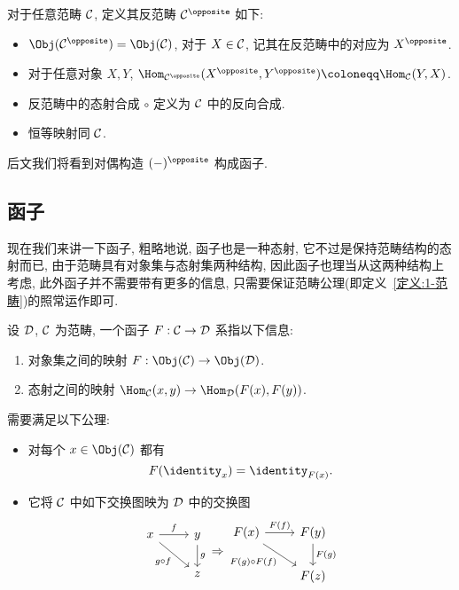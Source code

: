 \begin{definition}
    对于任意范畴 $\cal{C}$, 定义其反范畴 $\cal{C}^{\opposite}$ 如下:
    \begin{itemize}
        \item $\Obj(\cal{C}^{\opposite}) = \Obj(\cal{C})$, 对于 $X\in \cal{C}$, 记其在反范畴中的对应为 $X^{\opposite}$.
        \item 对于任意对象 $X,Y$, $\Hom_{\cal{C}^{\opposite}}(X^{\opposite},Y^{\opposite}) \coloneqq \Hom_{\cal{C}}(Y,X)$.
        \item 反范畴中的态射合成 $\circ$ 定义为 $\cal{C}$ 中的反向合成.
        \item 恒等映射同 $\cal{C}$.
    \end{itemize}
\end{definition}
后文我们将看到对偶构造 $(-)^{\opposite}$ 构成函子.
\subsection{函子}
现在我们来讲一下函子, 粗略地说, 函子也是一种态射, 它不过是保持范畴结构的态射而已, 由于范畴具有对象集与态射集两种结构, 因此函子也理当从这两种结构上考虑, 此外函子并不需要带有更多的信息, 只需要保证范畴公理(即定义~\ref{定义:1-范畴})的照常运作即可.
\begin{definition}[函子]
    设 $\cal{D}$, $\cal{C}$ 为范畴, 一个函子 $F: \cal{C} \to \cal{D}$ 系指以下信息:
    \begin{enumerate}
        \item 对象集之间的映射 $F: \Obj(\cal{C}) \to \Obj(\cal{D})$.
        \item 态射之间的映射 $\Hom_{\cal{C}}(x,y)\to \Hom_{\cal{D}}(F(x),F(y))$.
    \end{enumerate}
    需要满足以下公理:
    \begin{itemize}
        \item 对每个 $x\in \Obj(\cal{C})$ 都有
        \[
        F(\identity_x) = \identity_{F(x)}.
        \]
        \item 它将 $\cal{C}$ 中如下交换图映为 $\cal{D}$ 中的交换图
        \[\begin{tikzcd}
	x & y \\
	& z
	\arrow["f", from=1-1, to=1-2]
	\arrow["{g\circ f}"', from=1-1, to=2-2]
	\arrow["g", from=1-2, to=2-2]
       \end{tikzcd} \Rightarrow 
       \begin{tikzcd}
	{F(x)} & {F(y)} \\
	& {F(z)}
	\arrow["{F(f)}", from=1-1, to=1-2]
	\arrow["{F(g)\circ F(f)}"', from=1-1, to=2-2]
	\arrow["{F(g)}", from=1-2, to=2-2]
        \end{tikzcd}\]
    \end{itemize}
\end{definition}
